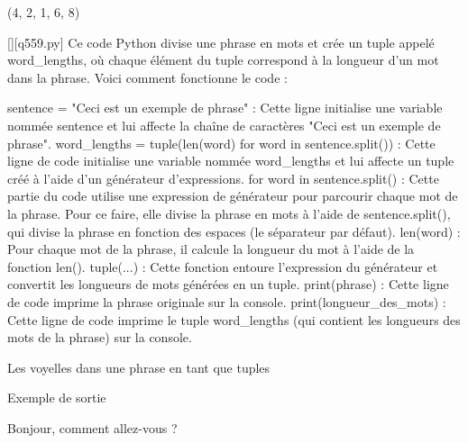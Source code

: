 (4, 2, 1, 6, 8)
        \par
        \begin{solution}
            \renewcommand{\nomfichier}{q559.py}
            \pythonfile{\chemincode \nomfichier}[][\nomfichier]
            Ce code Python divise une phrase en mots et crée un tuple appelé word_lengths, où chaque élément du tuple correspond à la longueur d'un mot dans la phrase. Voici comment fonctionne le code :

    sentence = "Ceci est un exemple de phrase" : Cette ligne initialise une variable nommée sentence et lui affecte la chaîne de caractères "Ceci est un exemple de phrase".
    word_lengths = tuple(len(word) for word in sentence.split()) : Cette ligne de code initialise une variable nommée word_lengths et lui affecte un tuple créé à l'aide d'un générateur d'expressions.
        for word in sentence.split() : Cette partie du code utilise une expression de générateur pour parcourir chaque mot de la phrase. Pour ce faire, elle divise la phrase en mots à l'aide de sentence.split(), qui divise la phrase en fonction des espaces (le séparateur par défaut).
        len(word) : Pour chaque mot de la phrase, il calcule la longueur du mot à l'aide de la fonction len().
        tuple(...) : Cette fonction entoure l'expression du générateur et convertit les longueurs de mots générées en un tuple.
    print(phrase) : Cette ligne de code imprime la phrase originale sur la console.
    print(longueur_des_mots) : Cette ligne de code imprime le tuple word_lengths (qui contient les longueurs des mots de la phrase) sur la console.
        \end{solution}
        

        \question
        Les voyelles dans une phrase en tant que tuples

Exemple de sortie

Bonjour, comment allez-vous ?

